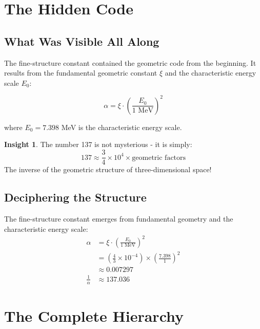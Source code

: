 \documentclass[12pt,a4paper]{article}
\theoremstyle{definition}
\newtheorem{insight}{Insight}[section]
\begin{document}
	\section{The Hidden Code}
	
	\subsection{What Was Visible All Along}
	
	The fine-structure constant contained the geometric code from the beginning. It results from the fundamental geometric constant $\xi$ and the characteristic energy scale $E_0$:
	
	\begin{equation}
		\alpha = \xi \cdot \left(\frac{E_0}{1 \text{ MeV}}\right)^2
	\end{equation}
	
	where $E_0 = 7.398$ MeV is the characteristic energy scale.
	
	\begin{insight}
		The number 137 is not mysterious - it is simply:
		\begin{equation}
			137 \approx \frac{3}{4} \times 10^4 \times \text{geometric factors}
		\end{equation}
		The inverse of the geometric structure of three-dimensional space!
	\end{insight}
	
	\subsection{Deciphering the Structure}
	
	\begin{fundamental}
		The fine-structure constant emerges from fundamental geometry and the characteristic energy scale:
		\begin{align}
			\alpha &= \xi \cdot \left(\frac{E_0}{1 \text{ MeV}}\right)^2 \\
			&= \left(\frac{4}{3} \times 10^{-4}\right) \times \left(\frac{7.398}{1}\right)^2 \\
			&\approx 0.007297 \\
			\frac{1}{\alpha} &\approx 137.036
		\end{align}
	\end{fundamental}
	
	\section{The Complete Hierarchy}
	
\end{document}
